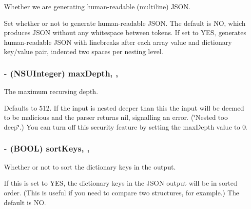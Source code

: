 Whether we are generating human-\/readable (multiline) J\+S\+O\+N. 

Set whether or not to generate human-\/readable J\+S\+O\+N. The default is N\+O, which produces J\+S\+O\+N without any whitespace between tokens. If set to Y\+E\+S, generates human-\/readable J\+S\+O\+N with linebreaks after each array value and dictionary key/value pair, indented two spaces per nesting level. \hypertarget{interface_s_b_json_stream_writer_a146e7e950ab74a0e766ffd860e454fc9}{}
\subsubsection[{max\+Depth}]{\setlength{\rightskip}{0pt plus 5cm}-\/ (N\+S\+U\+Integer) max\+Depth\hspace{0.3cm}{\ttfamily [read]}, {\ttfamily [write]}, {\ttfamily [atomic]}}\label{interface_s_b_json_stream_writer_a146e7e950ab74a0e766ffd860e454fc9}


The maximum recursing depth. 

Defaults to 512. If the input is nested deeper than this the input will be deemed to be malicious and the parser returns nil, signalling an error. (\char`\"{}\+Nested too deep\char`\"{}.) You can turn off this security feature by setting the max\+Depth value to 0. \hypertarget{interface_s_b_json_stream_writer_ab206c6844a0fd20307b5dfe881e17bf2}{}
\subsubsection[{sort\+Keys}]{\setlength{\rightskip}{0pt plus 5cm}-\/ (B\+O\+O\+L) sort\+Keys\hspace{0.3cm}{\ttfamily [read]}, {\ttfamily [write]}, {\ttfamily [atomic]}}\label{interface_s_b_json_stream_writer_ab206c6844a0fd20307b5dfe881e17bf2}


Whether or not to sort the dictionary keys in the output. 

If this is set to Y\+E\+S, the dictionary keys in the J\+S\+O\+N output will be in sorted order. (This is useful if you need to compare two structures, for example.) The default is N\+O. \hypertarget{interface_s_b_json_stream_writer_a4a23ef91623a82c08a1597937b7c4f3b}{}
